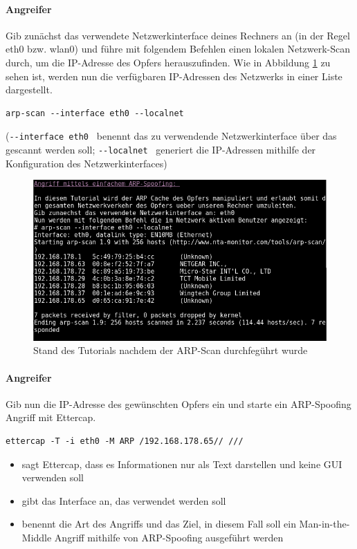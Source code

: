\paragraph{Angreifer} Gib zunächst das verwendete Netzwerkinterface deines Rechners an (in der Regel eth0 bzw. wlan0) und führe mit folgendem Befehlen einen lokalen Netzwerk-Scan durch, um die IP-Adresse des Opfers herauszufinden. Wie in Abbildung \ref{fig:arpscan} zu sehen ist, werden nun die verfügbaren IP-Adressen des Netzwerks in einer Liste dargestellt.
\begin{lstlisting}
arp-scan --interface eth0 --localnet
\end{lstlisting}
(\colorbox{altgray}{\lstinline|--interface eth0 |} benennt das zu verwendende Netzwerkinterface über das gescannt werden soll; \colorbox{altgray}{\lstinline|--localnet |} generiert die IP-Adressen mithilfe der Konfiguration des Netzwerkinterfaces)

\begin{figure}
	\centering
	\includegraphics[width=\textwidth]{images/arp/arp_scan}
	\caption{Stand des Tutorials nachdem der ARP-Scan durchfegührt wurde}
	\label{fig:arpscan}
\end{figure}

\paragraph{Angreifer} Gib nun die IP-Adresse des gewünschten Opfers ein und starte ein ARP-Spoofing Angriff mit Ettercap.
\begin{lstlisting}
ettercap -T -i eth0 -M ARP /192.168.178.65// ///
\end{lstlisting}

\begin{itemize}
	\item {} sagt Ettercap, dass es  Informationen nur als Text darstellen und keine GUI verwenden soll
	\item {} gibt das Interface an, das verwendet werden soll
	\item {} benennt die Art des Angriffs und das Ziel, in diesem Fall soll ein Man-in-the-Middle Angriff mithilfe von ARP-Spoofing ausgeführt werden
\end{itemize}


